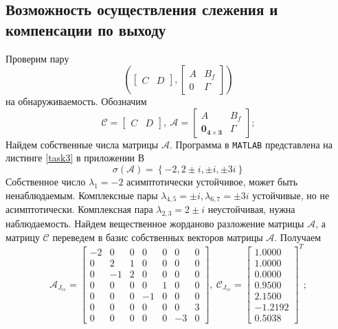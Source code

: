 \documentclass[a4paper, 12pt]{article}
\begin{document}
    \subsection{Возможность осуществления слежения и компенсации по выходу}
    Проверим пару $$\left(\begin{bmatrix}
        C &D
    \end{bmatrix},\begin{bmatrix}
        A &B_f\\
        0 &\Gamma
    \end{bmatrix}\right)$$ на обнаруживаемость. Обозначим
    $$
    \mathcal{C}=\begin{bmatrix}
        C &D
    \end{bmatrix},\ \mathcal{A}=\begin{bmatrix}
        A &B_f\\
        \mathbf{0_{4\times3}} &\Gamma
    \end{bmatrix};
    $$
    Найдем собственные числа матрицы $\mathcal{A}$. Программа в \texttt{MATLAB} представлена на листинге \ref{task3} в приложении В
    $$
    \sigma\left( \mathcal{A} \right)=\left\{ -2,2\pm i,\pm i, \pm3i \right\}
    $$
    Собственное число $\lambda_1=-2$ асимптотически устойчивое, может быть ненаблюдаемым.
    Комплексные пары $\lambda_{4,5}=\pm i,\lambda_{6,7}=\pm3i$ устойчивые, но не асимптотически.
    Комплексная пара $\lambda_{2,3}=2\pm i$ неустойчивая, нужна наблюдаемость.
    Найдем вещественное жорданово разложение матрицы $\mathcal{A}$,
    а матрицу $\mathcal{C}$ переведем в базис собственных
    векторов матрицы $\mathcal{A}$. Получаем
    $$
    \mathcal{A}_{J_{re}}=\begin{bmatrix}
        -2         &0         &0    &0    &0   &0   &0\\
         0    &2    &1    &0    &0   &0   &0\\
         0   &-1    &2    &0    &0   &0   &0\\
         0         &0         &0         &0    &1         &0         &0\\
         0         &0         &0   &-1         &0         &0         &0\\
         0         &0         &0         &0         &0         &0    &3\\
         0         &0         &0         &0         &0   &-3         &0
    \end{bmatrix},\ \mathcal{C}_{J_{re}}=\begin{bmatrix}
        1.0000\\    1.0000\\         0.0000\\    0.9500\\    2.1500\\   -1.2192\\    0.5038
    \end{bmatrix}^T;
    $$
\end{document}
